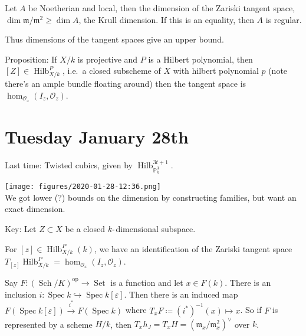 \begin{description}
\tightlist
\item[Fact (from Algebra)]
Let \(A\) be Noetherian and local, then the dimension of the Zariski
tangent space, \(\dim {\mathfrak{m}}/{\mathfrak{m}}^2 \geq \dim A\), the
Krull dimension. If this is an equality, then \(A\) is regular.
\end{description}

Thus dimensions of the tangent spaces give an upper bound.

Proposition: If \(X/k\) is projective and \(P\) is a Hilbert polynomial,
then \([Z] \in \operatorname{Hilb}_{X/k}^P\), i.e.~a closed subscheme of
\(X\) with hilbert polynomial \(p\) (note there's an ample bundle
floating around) then the tangent space is
\(\hom_{{\mathcal{O}}_x}(I_z, {\mathcal{O}}_z)\).

\hypertarget{tuesday-january-28th}{%
\section{Tuesday January 28th}\label{tuesday-january-28th}}

Last time: Twisted cubics, given by
\(\operatorname{Hilb}_{{\mathbb{P}}^3_k}^{3t+1}\).

\texttt{[image: figures/2020-01-28-12:36.png]}\\

We got lower (?) bounds on the dimension by constructing families, but
want an exact dimension.

Key: Let \(Z\subset X\) be a closed \(k{\hbox{-}}\)dimensional subspace.

\begin{description}
\tightlist
\item[Proposition]
For \([z] \in \operatorname{Hilb}_{X/k}^P(k)\), we have an
identification of the Zariski tangent space
\(T_[z] \operatorname{Hilb}_{X/k}^P = \hom_{{\mathcal{O}}_x}(I_z, {\mathcal{O}}_z)\).
\end{description}

Say
\(F: ({\operatorname{Sch}}/K)^\operatorname{op}\to {\operatorname{Set}}\)
is a function and let \(x\in F(k)\). There is an inclusion
\(i: \operatorname{Spec}k \hookrightarrow\operatorname{Spec}k[\varepsilon]\).
Then there is an induced map
\(F(\operatorname{Spec}k [\varepsilon]) \xrightarrow{i^*} F(\operatorname{Spec}k)\)
where \(T_x F \coloneqq(i^*)^{-1}(x) \mapsto x\). So if \(F\) is
represented by a scheme \(H/k\), then
\(T_x h_J = T_x H = ({\mathfrak{m}}_x / {\mathfrak{m}}_x^2)^\vee\) over
\(k\).

